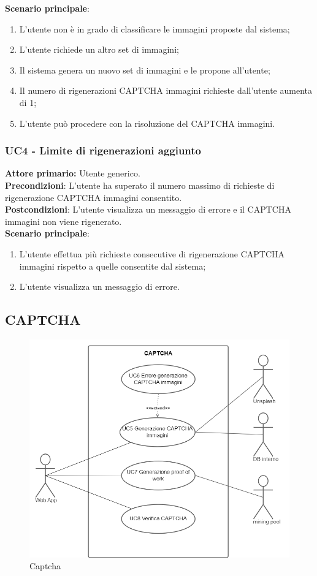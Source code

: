 \textbf{Scenario principale}:
\begin{enumerate}
   \item L'utente non è in grado di classificare le immagini proposte dal sistema;
   \item L'utente richiede un altro set di immagini;
   \item Il sistema genera un nuovo set di immagini e le propone all'utente;
   \item Il numero di rigenerazioni CAPTCHA immagini richieste dall’utente aumenta di 1;
   \item L'utente può procedere con la risoluzione del CAPTCHA immagini.
\end{enumerate}

\subsubsection{UC4 - Limite di rigenerazioni aggiunto}
\textbf{Attore primario:} Utente generico.\\
\textbf{Precondizioni}: L'utente ha superato il numero massimo di richieste di rigenerazione CAPTCHA immagini consentito.\\
\textbf{Postcondizioni}: L’utente visualizza un messaggio di errore e il CAPTCHA immagini non viene rigenerato.\\

\textbf{Scenario principale}:
\begin{enumerate}
    \item L'utente effettua più richieste consecutive di rigenerazione CAPTCHA immagini rispetto a quelle consentite dal sistema;
	\item L’utente visualizza un messaggio di errore.
\end{enumerate}

\subsection{CAPTCHA}

\begin{figure}[H]
    \centering
    \includegraphics[scale=0.4]{img/captcha.png}
    \caption{Captcha}
\end{figure}


